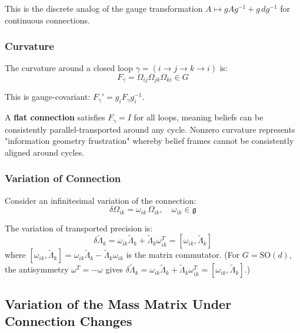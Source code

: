 \documentclass[12pt]{article}
\begin{document}
This is the discrete analog of the gauge transformation $A \mapsto gAg^{-1} + g\,dg^{-1}$ for continuous connections.

\subsubsection{Curvature}

The curvature around a closed loop $\gamma = (i \to j \to k \to i)$ is:
\begin{equation}
F_\gamma = \Omega_{ij}\Omega_{jk}\Omega_{ki} \in G
\end{equation}

This is gauge-covariant: $F_\gamma' = g_i F_\gamma g_i^{-1}$.

A \textbf{flat connection} satisfies $F_\gamma = I$ for all loops, meaning beliefs can be consistently parallel-transported around any cycle. Nonzero curvature represents "information geometry frustration" whereby belief frames cannot be consistently aligned around cycles.

\subsubsection{Variation of Connection}

Consider an infinitesimal variation of the connection:
\begin{equation}
\delta\Omega_{ik} = \omega_{ik} \, \Omega_{ik}, \quad \omega_{ik} \in \mathfrak{g}
\end{equation}

The variation of transported precision is:
\begin{equation}
\delta\tilde{\Lambda}_k = \omega_{ik}\tilde{\Lambda}_k + \tilde{\Lambda}_k\omega_{ik}^T = [\omega_{ik}, \tilde{\Lambda}_k]
\end{equation}
where $[\omega_{ik}, \tilde{\Lambda}_k] = \omega_{ik}\tilde{\Lambda}_k - \tilde{\Lambda}_k\omega_{ik}$ is the matrix commutator. (For $G = \mathrm{SO}(d)$, the antisymmetry $\omega^T = -\omega$ gives $\delta\tilde{\Lambda}_k = \omega_{ik}\tilde{\Lambda}_k + \tilde{\Lambda}_k\omega_{ik}^T = [\omega_{ik}, \tilde{\Lambda}_k]$.)

\subsection{Variation of the Mass Matrix Under Connection Changes}
\end{document}
